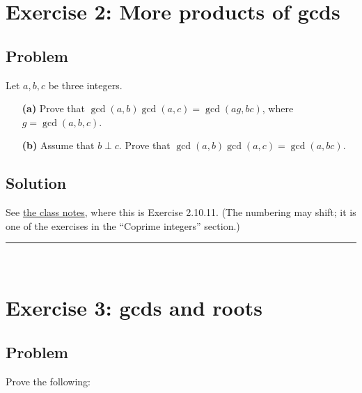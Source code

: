 \documentclass[paper=a4, fontsize=12pt]{scrartcl} %
\newcommand{\tup}[1]{\left( #1 \right)}
\newcommand{\horrule}[1]{\rule{\linewidth}{#1}} %
\theoremstyle{plainsl}
\theoremstyle{definition}
\theoremstyle{remark}
\begin{document}
\section{Exercise 2: More products of gcds}

\subsection{Problem}

Let $a, b, c$ be three integers.

\begin{enumerate}

\item[\textbf{(a)}]
Prove that
$\gcd\tup{a, b} \gcd\tup{a, c}
= \gcd\tup{ag, bc}$,
where $g = \gcd\tup{a, b, c}$.

\item[\textbf{(b)}]
Assume that $b \perp c$.
Prove that
$\gcd\tup{a, b} \gcd\tup{a, c} = \gcd\tup{a, bc}$.

\end{enumerate}

\subsection{Solution}

See
\href{http://www-users.math.umn.edu/~dgrinber/19s/notes.pdf}{the class notes},
where this is Exercise 2.10.11. (The numbering may shift; it is one of the
exercises in the
``Coprime integers''
section.)

\horrule{0.3pt} \\[0.4cm]

\section{Exercise 3: gcds and roots}

\subsection{Problem}

Prove the following:
\end{document}
